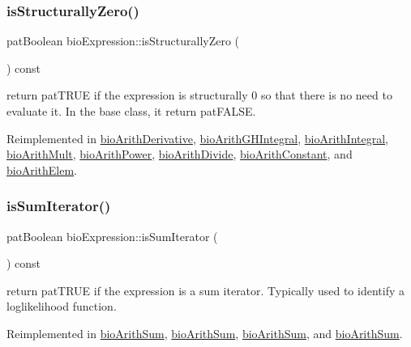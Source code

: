 \subsubsection{\texorpdfstring{is\+Structurally\+Zero()}{isStructurallyZero()}}
{\footnotesize\ttfamily pat\+Boolean bio\+Expression\+::is\+Structurally\+Zero (\begin{DoxyParamCaption}{ }\end{DoxyParamCaption}) const\hspace{0.3cm}{\ttfamily [virtual]}}

return pat\+T\+R\+UE if the expression is structurally 0 so that there is no need to evaluate it. In the base class, it return pat\+F\+A\+L\+SE. 

Reimplemented in \hyperlink{classbio_arith_derivative_a8de59d734f7c023570046dd184d71a82}{bio\+Arith\+Derivative}, \hyperlink{classbio_arith_g_h_integral_a86510e9d5d13234c931278ec496e1aec}{bio\+Arith\+G\+H\+Integral}, \hyperlink{classbio_arith_integral_a7f96ce250c987eb2022512c9f65cdc1b}{bio\+Arith\+Integral}, \hyperlink{classbio_arith_mult_aedfa0cf623dde749da1760ad7fd9e326}{bio\+Arith\+Mult}, \hyperlink{classbio_arith_power_a65021bc0ae804520ac1e64c665abc62a}{bio\+Arith\+Power}, \hyperlink{classbio_arith_divide_a0363fd1159b9167508dcf989844eebb7}{bio\+Arith\+Divide}, \hyperlink{classbio_arith_constant_acd4439b84514d6612a97d422ba8f60c1}{bio\+Arith\+Constant}, and \hyperlink{classbio_arith_elem_a9d64d5197cb2cab10396c3e9d8add42b}{bio\+Arith\+Elem}.

\mbox{\label{classbio_expression_aee422b6c10811d2478972c83300acbb0}} 
\subsubsection{\texorpdfstring{is\+Sum\+Iterator()}{isSumIterator()}}
{\footnotesize\ttfamily pat\+Boolean bio\+Expression\+::is\+Sum\+Iterator (\begin{DoxyParamCaption}{ }\end{DoxyParamCaption}) const\hspace{0.3cm}{\ttfamily [virtual]}}

return pat\+T\+R\+UE if the expression is a sum iterator. Typically used to identify a loglikelihood function. 

Reimplemented in \hyperlink{classbio_arith_sum_ab0747dc4d0f4fbe2cb246b265ec3cd11}{bio\+Arith\+Sum}, \hyperlink{classbio_arith_sum_ab0747dc4d0f4fbe2cb246b265ec3cd11}{bio\+Arith\+Sum}, \hyperlink{classbio_arith_sum_a57d25760240c2d93b414d79679cfa5a3}{bio\+Arith\+Sum}, and \hyperlink{classbio_arith_sum_ab0747dc4d0f4fbe2cb246b265ec3cd11}{bio\+Arith\+Sum}.

